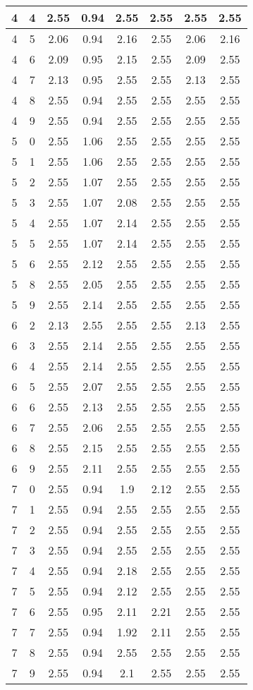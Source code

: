\begin{longtable}{|c|c||c||c|c|c||c|c|}
	4 & 4 & 2.55 & 0.94 & 2.55 & 2.55 & 2.55 & 2.55 \\ \hline
	4 & 5 & 2.06 & 0.94 & 2.16 & 2.55 & 2.06 & 2.16 \\ \hline
	4 & 6 & 2.09 & 0.95 & 2.15 & 2.55 & 2.09 & 2.55 \\ \hline
	4 & 7 & 2.13 & 0.95 & 2.55 & 2.55 & 2.13 & 2.55 \\ \hline
	4 & 8 & 2.55 & 0.94 & 2.55 & 2.55 & 2.55 & 2.55 \\ \hline
	4 & 9 & 2.55 & 0.94 & 2.55 & 2.55 & 2.55 & 2.55 \\ \hline
	5 & 0 & 2.55 & 1.06 & 2.55 & 2.55 & 2.55 & 2.55 \\ \hline
	5 & 1 & 2.55 & 1.06 & 2.55 & 2.55 & 2.55 & 2.55 \\ \hline
	5 & 2 & 2.55 & 1.07 & 2.55 & 2.55 & 2.55 & 2.55 \\ \hline
	5 & 3 & 2.55 & 1.07 & 2.08 & 2.55 & 2.55 & 2.55 \\ \hline
	5 & 4 & 2.55 & 1.07 & 2.14 & 2.55 & 2.55 & 2.55 \\ \hline
	5 & 5 & 2.55 & 1.07 & 2.14 & 2.55 & 2.55 & 2.55 \\ \hline
	5 & 6 & 2.55 & 2.12 & 2.55 & 2.55 & 2.55 & 2.55 \\ \hline
	5 & 8 & 2.55 & 2.05 & 2.55 & 2.55 & 2.55 & 2.55 \\ \hline
	5 & 9 & 2.55 & 2.14 & 2.55 & 2.55 & 2.55 & 2.55 \\ \hline
	6 & 2 & 2.13 & 2.55 & 2.55 & 2.55 & 2.13 & 2.55 \\ \hline
	6 & 3 & 2.55 & 2.14 & 2.55 & 2.55 & 2.55 & 2.55 \\ \hline
	6 & 4 & 2.55 & 2.14 & 2.55 & 2.55 & 2.55 & 2.55 \\ \hline
	6 & 5 & 2.55 & 2.07 & 2.55 & 2.55 & 2.55 & 2.55 \\ \hline
	6 & 6 & 2.55 & 2.13 & 2.55 & 2.55 & 2.55 & 2.55 \\ \hline
	6 & 7 & 2.55 & 2.06 & 2.55 & 2.55 & 2.55 & 2.55 \\ \hline
	6 & 8 & 2.55 & 2.15 & 2.55 & 2.55 & 2.55 & 2.55 \\ \hline
	6 & 9 & 2.55 & 2.11 & 2.55 & 2.55 & 2.55 & 2.55 \\ \hline
	7 & 0 & 2.55 & 0.94 & 1.9 & 2.12 & 2.55 & 2.55 \\ \hline
	7 & 1 & 2.55 & 0.94 & 2.55 & 2.55 & 2.55 & 2.55 \\ \hline
	7 & 2 & 2.55 & 0.94 & 2.55 & 2.55 & 2.55 & 2.55 \\ \hline
	7 & 3 & 2.55 & 0.94 & 2.55 & 2.55 & 2.55 & 2.55 \\ \hline
	7 & 4 & 2.55 & 0.94 & 2.18 & 2.55 & 2.55 & 2.55 \\ \hline
	7 & 5 & 2.55 & 0.94 & 2.12 & 2.55 & 2.55 & 2.55 \\ \hline
	7 & 6 & 2.55 & 0.95 & 2.11 & 2.21 & 2.55 & 2.55 \\ \hline
	7 & 7 & 2.55 & 0.94 & 1.92 & 2.11 & 2.55 & 2.55 \\ \hline
	7 & 8 & 2.55 & 0.94 & 2.55 & 2.55 & 2.55 & 2.55 \\ \hline
	7 & 9 & 2.55 & 0.94 & 2.1 & 2.55 & 2.55 & 2.55 \\ \hline
\end{longtable}
